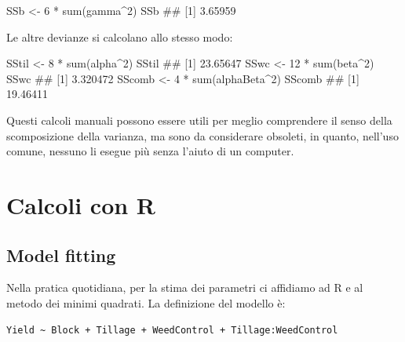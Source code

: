 \documentclass[a4paper,12pt,oneside]{book}
\newenvironment{Shaded}{\begin{snugshade}}{\end{snugshade}}
\newcommand{\DecValTok}[1]{#1}
\newcommand{\SpecialCharTok}[1]{#1}
\newcommand{\DocumentationTok}[1]{#1}
\newcommand{\OtherTok}[1]{#1}
\newcommand{\FunctionTok}[1]{#1}
\newcommand{\NormalTok}[1]{#1}
\begin{document}
\begin{Shaded}
\begin{Highlighting}[]
\NormalTok{SSb }\OtherTok{\textless{}{-}} \DecValTok{6} \SpecialCharTok{*} \FunctionTok{sum}\NormalTok{(gamma}\SpecialCharTok{\^{}}\DecValTok{2}\NormalTok{)}
\NormalTok{SSb}
\DocumentationTok{\#\# [1] 3.65959}
\end{Highlighting}
\end{Shaded}

Le altre devianze si calcolano allo stesso modo:

\begin{Shaded}
\begin{Highlighting}[]
\NormalTok{SStil }\OtherTok{\textless{}{-}} \DecValTok{8} \SpecialCharTok{*} \FunctionTok{sum}\NormalTok{(alpha}\SpecialCharTok{\^{}}\DecValTok{2}\NormalTok{)}
\NormalTok{SStil}
\DocumentationTok{\#\# [1] 23.65647}
\NormalTok{SSwc }\OtherTok{\textless{}{-}} \DecValTok{12} \SpecialCharTok{*} \FunctionTok{sum}\NormalTok{(beta}\SpecialCharTok{\^{}}\DecValTok{2}\NormalTok{)}
\NormalTok{SSwc}
\DocumentationTok{\#\# [1] 3.320472}
\NormalTok{SScomb }\OtherTok{\textless{}{-}} \DecValTok{4} \SpecialCharTok{*} \FunctionTok{sum}\NormalTok{(alphaBeta}\SpecialCharTok{\^{}}\DecValTok{2}\NormalTok{)}
\NormalTok{SScomb}
\DocumentationTok{\#\# [1] 19.46411}
\end{Highlighting}
\end{Shaded}

Questi calcoli manuali possono essere utili per meglio comprendere il senso della scomposizione della varianza, ma sono da considerare obsoleti, in quanto, nell'uso comune, nessuno li esegue più senza l'aiuto di un computer.

\hypertarget{calcoli-con-r}{%
\section{Calcoli con R}\label{calcoli-con-r}}

\hypertarget{model-fitting}{%
\subsection{Model fitting}\label{model-fitting}}

Nella pratica quotidiana, per la stima dei parametri ci affidiamo ad R e al metodo dei minimi quadrati. La definizione del modello è:

\begin{verbatim}
Yield ~ Block + Tillage + WeedControl + Tillage:WeedControl
\end{verbatim}
\end{document}

